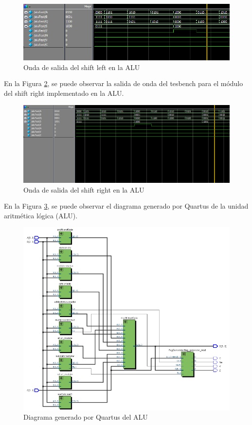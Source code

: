 \documentclass[journal]{IEEEtran}
\begin{document}
	\begin{figure}[hbtp]
		\centering
		\includegraphics[scale = 0.4]{img/wsl.png}
		\caption{Onda de salida del shift left en la ALU}
		\label{fig:wsl}
	\end{figure}
	
	En la Figura \ref{fig:wsr}, se puede observar la salida de onda del tesbench para el módulo del shift right implementado en la ALU.
	
	\begin{figure}[hbtp]
		\centering
		\includegraphics[scale = 0.3]{img/wsr.png}
		\caption{Onda de salida del shift right en la ALU}
		\label{fig:wsr}
	\end{figure}
	
	En la Figura \ref{fig:niv31}, se puede observar el diagrama generado por Quartus de la unidad aritmética lógica (ALU).
	
	\begin{figure}[hbtp]
		\centering
		\includegraphics[scale = 0.45]{img/nivel31.PNG}
		\caption{Diagrama generado por Quartus del ALU}
		\label{fig:niv31}
	\end{figure}
	
\end{document}
